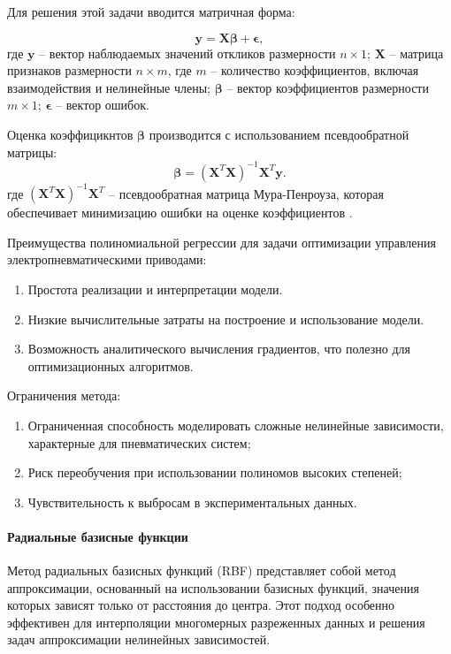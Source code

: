 Для решения этой задачи вводится матричная форма:

\begin{equation}
	\mathbf{y} = \mathbf{X} \boldsymbol{\beta} + \boldsymbol{\epsilon},
\end{equation}
где $\mathbf{y}$ -- вектор наблюдаемых значений откликов размерности $n \times 1$;
$\mathbf{X}$ -- матрица признаков размерности $n \times m$, где $m$ -- количество коэффициентов,
включая взаимодействия и нелинейные члены;
$\boldsymbol{\beta}$ -- вектор коэффициентов размерности $m \times 1$;
$\boldsymbol{\epsilon}$ -- вектор ошибок.

Оценка коэффицикнтов $\boldsymbol{\beta}$ производится с использованием псевдообратной матрицы:
\begin{equation}
	\boldsymbol{\beta} = (\mathbf{X}^T \mathbf{X})^{-1} \mathbf{X}^T \mathbf{y}.
\end{equation}
где $(\mathbf{X}^T \mathbf{X})^{-1} \mathbf{X}^T$ -- псевдообратная матрица Мура-Пенроуза,
которая обеспечивает минимизацию ошибки на оценке коэффициентов \cite{meyer2009matrix}.

Преимущества полиномиальной регрессии для задачи оптимизации управления электропневматическими приводами:
\begin{enumerate}
	\item Простота реализации и интерпретации модели.
	\item Низкие вычислительные затраты на построение и использование модели.
	\item Возможность аналитического вычисления градиентов, что полезно для оптимизационных алгоритмов.
\end{enumerate}

Ограничения метода:
\begin{enumerate}
	\item Ограниченная способность моделировать сложные нелинейные зависимости, характерные для пневматических систем;
	\item Риск переобучения при использовании полиномов высоких степеней;
	\item Чувствительность к выбросам в экспериментальных данных.
\end{enumerate}

\paragraph{Радиальные базисные функции}

Метод радиальных базисных функций (RBF) представляет собой метод аппроксимации, основанный
на использовании базисных функций, значения которых зависят только от расстояния до центра.
Этот подход особенно эффективен для интерполяции многомерных разреженных данных и решения задач аппроксимации нелинейных зависимостей.


